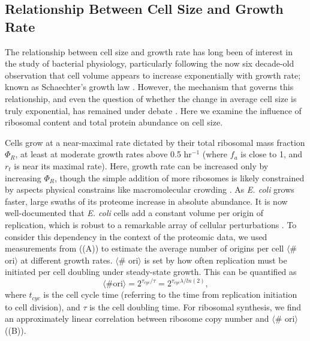 \subsection{Relationship Between Cell Size and Growth Rate}
The relationship between cell size and growth rate has long been of interest in
the study of bacterial physiology, particularly following the now six decade-old
observation that cell volume appears to increase exponentially with growth rate;
known as Schaechter's growth law \citep{schaechter1958, taheriaraghi2015}.
However, the mechanism that governs this relationship, and even the question of
whether the change in average cell size is truly exponential, has remained under
debate \citep{harris2018}.  Here we examine the influence of ribosomal content
and total protein abundance on cell size.

Cells grow at a near-maximal rate dictated by their total ribosomal mass
fraction $\Phi_R$, at least at moderate growth rates above 0.5 hr$^{-1}$ (where
$f_a$ is close to 1, and $r_t$ is near its maximal rate).  Here, growth rate can
be increased only by increasing $\Phi_R$, though the simple addition of more
ribosomes is likely constrained by aspects physical constrains like
macromolecular crowding \citep{delarue2018, solerbistue2020}. As \textit{E.
coli} grows faster, large swaths of its proteome increase in absolute abundance.
It is now well-documented that \textit{E. coli} cells add a constant volume per
origin of replication, which is
robust to a remarkable array of cellular perturbations \citep{si2017}. To
consider this dependency in the context of the proteomic data, we used
measurements from \cite{si2017} ((A)) to estimate the
average number of origins per cell $\langle$\# ori$\rangle$ at different growth rates.
$\langle$\# ori$\rangle$ is set by how often
replication must be initiated per cell doubling under steady-state growth.
This can be quantified as
\begin{equation}
    \langle \text{\# ori} \rangle = 2^{\tau_{cyc} / \tau} = 2^{\tau_{cyc} \lambda / ln(2)},
    \label{eq:Nori}
\end{equation}
where $t_{cyc}$ is the cell cycle time (referring to the time from replication
initiation to cell division), and $\tau$ is the cell doubling time. For
ribosomal synthesis, we find an approximately linear correlation between
ribosome copy number and $\langle$\# ori$\rangle$
((B)).

